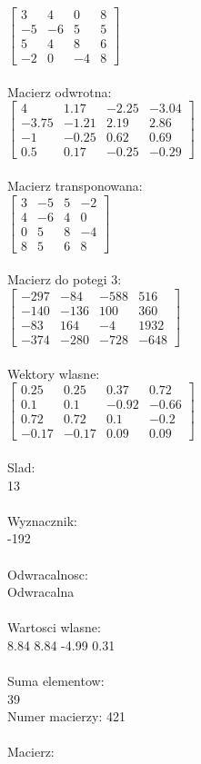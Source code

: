 \documentclass[a4paper,12pt]{article}
\begin{document}
$\begin{bmatrix} 3&4&0&8\\-5&-6&5&5\\5&4&8&6\\-2&0&-4&8 \end{bmatrix}$
\\
\\
Macierz odwrotna:\\

$\begin{bmatrix} 4&1.17&-2.25&-3.04\\-3.75&-1.21&2.19&2.86\\-1&-0.25&0.62&0.69\\0.5&0.17&-0.25&-0.29 \end{bmatrix}$
\\
\\
Macierz transponowana:\\

$\begin{bmatrix} 3&-5&5&-2\\4&-6&4&0\\0&5&8&-4\\8&5&6&8 \end{bmatrix}$
\\
\\
Macierz do potegi 3:\\

$\begin{bmatrix} -297&-84&-588&516\\-140&-136&100&360\\-83&164&-4&1932\\-374&-280&-728&-648 \end{bmatrix}$
\\
\\
Wektory wlasne:\\

$\begin{bmatrix} 0.25&0.25&0.37&0.72\\0.1&0.1&-0.92&-0.66\\0.72&0.72&0.1&-0.2\\-0.17&-0.17&0.09&0.09 \end{bmatrix}$
\\
\\
Slad:\\
13
\\
\\
Wyznacznik:\\
-192
\\
\\
Odwracalnosc:\\
Odwracalna
\\
\\
Wartosci wlasne:\\
8.84 8.84 -4.99 0.31
\\
\\
Suma elementow:\\
39
\\
\newpage
Numer macierzy:
421
\\
\\
Macierz:\\
\end{document}
